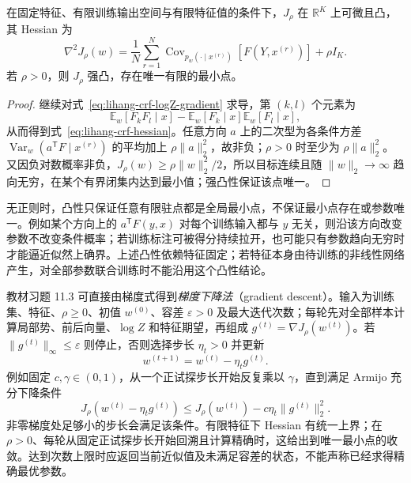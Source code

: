 \begin{proposition}
\label{prop:lihang-crf-convexity}
在固定特征、有限训练输出空间与有限特征值的条件下，$J_\rho$ 在 $\mathbb R^K$ 上可微且凸，其 Hessian 为
\begin{equation}
\label{eq:lihang-crf-hessian}
  \nabla^2J_\rho(w)
  =\frac1N\sum_{r=1}^N
       \operatorname{Cov}_{p_w(\cdot\mid x^{(r)})}
                    [F(Y,x^{(r)})]+\rho I_K.
\end{equation}
若 $\rho>0$，则 $J_\rho$ 强凸，存在唯一有限的最小点。
\end{proposition}
\begin{proof}
继续对式~\eqref{eq:lihang-crf-logZ-gradient} 求导，第 $(k,l)$ 个元素为
\[
  \mathbb E_w[F_kF_l\mid x]
     -\mathbb E_w[F_k\mid x]\mathbb E_w[F_l\mid x],
\]
从而得到式~\eqref{eq:lihang-crf-hessian}。任意方向 $a$ 上的二次型为各条件方差 $\operatorname{Var}_w(a^{\mathsf T}F\mid x^{(r)})$ 的平均加上 $\rho\lVert a\rVert_2^2$，故非负；$\rho>0$ 时至少为 $\rho\lVert a\rVert_2^2$。又因负对数概率非负，$J_\rho(w)\geq\rho\lVert w\rVert_2^2/2$，所以目标连续且随 $\lVert w\rVert_2\to\infty$ 趋向无穷，在某个有界闭集内达到最小值；强凸性保证该点唯一。
\end{proof}

无正则时，凸性只保证任意有限驻点都是全局最小点，不保证最小点存在或参数唯一。例如某个方向上的 $a^{\mathsf T}F(y,x)$ 对每个训练输入都与 $y$ 无关，则沿该方向改变参数不改变条件概率；若训练标注可被得分持续拉开，也可能只有参数趋向无穷时才能逼近似然上确界。上述凸性依赖特征固定；若特征本身由待训练的非线性网络产生，对全部参数联合训练时不能沿用这个凸性结论。

教材习题 11.3 可直接由梯度式得到\emph{梯度下降法}（gradient descent）。输入为训练集、特征、$\rho\geq0$、初值 $w^{(0)}$、容差 $\varepsilon>0$ 及最大迭代次数；每轮先对全部样本计算局部势、前后向量、$\log Z$ 和特征期望，再组成 $g^{(t)}=\nabla J_\rho(w^{(t)})$。若 $\lVert g^{(t)}\rVert_\infty\leq\varepsilon$ 则停止，否则选择步长 $\eta_t>0$ 并更新
\begin{equation}
\label{eq:lihang-crf-gradient-descent}
  w^{(t+1)}=w^{(t)}-\eta_tg^{(t)}.
\end{equation}
例如固定 $c,\gamma\in(0,1)$，从一个正试探步长开始反复乘以 $\gamma$，直到满足 Armijo 充分下降条件
\[
  J_\rho(w^{(t)}-\eta_tg^{(t)})
  \leq J_\rho(w^{(t)})-c\eta_t\lVert g^{(t)}\rVert_2^2.
\]
非零梯度处足够小的步长会满足该条件。有限特征下 Hessian 有统一上界；在 $\rho>0$、每轮从固定正试探步长开始回溯且计算精确时，这给出到唯一最小点的收敛。达到次数上限时应返回当前近似值及未满足容差的状态，不能声称已经求得精确最优参数。

